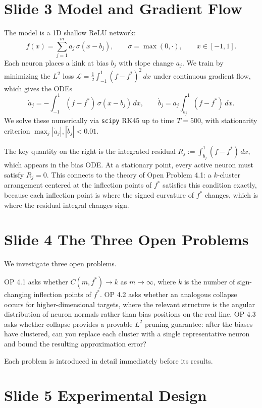 \documentclass[11pt]{article}
\begin{document}
\section*{Slide 3 \quad Model and Gradient Flow}

The model is a 1D shallow ReLU network:
\[
  f(x) = \sum_{j=1}^m a_j\,\sigma(x - b_j), \qquad \sigma = \max(0,\cdot), \qquad x \in [-1,1].
\]
Each neuron places a kink at bias $b_j$ with slope change $a_j$.
We train by minimizing the $L^2$ loss $\mathcal{L} = \frac{1}{2}\int_{-1}^1 (f - f^*)^2\,dx$ under continuous gradient flow, which gives the ODEs
\[
  \dot{a}_j = -\int_{-1}^1 (f - f^*)\,\sigma(x - b_j)\,dx, \qquad
  \dot{b}_j = a_j \int_{b_j}^1 (f - f^*)\,dx.
\]
We solve these numerically via \texttt{scipy} RK45 up to time $T = 500$, with stationarity criterion $\max_j |\dot{a}_j|, |\dot{b}_j| < 0.01$.

The key quantity on the right is the integrated residual $R_j := \int_{b_j}^1(f - f^*)\,dx$, which appears in the bias ODE.
At a stationary point, every active neuron must satisfy $R_j = 0$.
This connects to the theory of Open Problem 4.1: a $k$-cluster arrangement centered at the inflection points of $f^*$ satisfies this condition exactly, because each inflection point is where the signed curvature of $f^*$ changes, which is where the residual integral changes sign.

\section*{Slide 4 \quad The Three Open Problems}

We investigate three open problems.

OP 4.1 asks whether $C(m, f^*) \to k$ as $m \to \infty$, where $k$ is the number of sign-changing inflection points of $f^*$.
OP 4.2 asks whether an analogous collapse occurs for higher-dimensional targets, where the relevant structure is the angular distribution of neuron normals rather than bias positions on the real line.
OP 4.3 asks whether collapse provides a provable $L^2$ pruning guarantee: after the biases have clustered, can you replace each cluster with a single representative neuron and bound the resulting approximation error?

Each problem is introduced in detail immediately before its results.

\section*{Slide 5 \quad Experimental Design}
\end{document}
